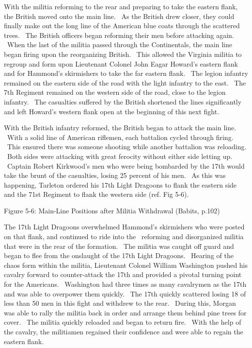 With the militia reforming to the rear and preparing to take the eastern flank,
the British moved onto the main line.  As the British drew closer, they could
finally make out the long line of the American blue coats through the scattered
trees.  The British officers began reforming their men before attacking again.
 When the last of the militia passed through the Continentals, the main line
began firing upon the reorganizing British.  This allowed the Virginia militia
to regroup and form upon Lieutenant Colonel John Eagar Howard’s eastern flank
and for Hammond’s skirmishers to take the far eastern flank.  The legion
infantry remained on the eastern side of the road with the light infantry to the
east.  The 7th Regiment remained on the western side of the road, close to the
legion infantry.  The casualties suffered by the British shortened the lines
significantly and left Howard’s western flank open at the beginning of this next
fight.  

With the British infantry reformed, the British began to attack the main line.
 With a solid line of American riflemen, each battalion cycled through firing.
 This ensured there was someone shooting while another battalion was reloading.
 Both sides were attacking with great ferocity without either side letting up.
 Captain Robert Kirkwood’s men who were being bombarded by the 17th would take
the brunt of the casualties, losing 25 percent of his men.  As this was
happening, Tarleton ordered his 17th Light Dragoons to flank the eastern side
and the 71st Regiment to flank the western side (ref. Fig 5-6).



Figure 5-6: Main-Line Positions after Militia Withdrawal (Babits, p.102)





The 17th Light Dragoons overwhelmed Hammond’s skirmishers who were posted on
that flank, and continued to ride into the  reforming and disorganized militia
that were in the rear of the formation.  The militia was caught off guard and
began to flee from the onslaught of the 17th Light Dragoons.  Hearing of the
chaos form within the militia, Lieutenant Colonel William Washington pushed his
cavalry forward to counter-attack the 17th and provided a pivotal turning point
for the Americans.  Washington had three times as many cavalrymen as the 17th
and was able to overpower them quickly.  The 17th quickly scattered losing 18 of
less than 50 men in this fight and withdrew to the rear.  During this, Morgan
was able to rally the militia back in order and arrange them behind pine trees
for cover.  The militia quickly reloaded and began to return fire.  With the
help of the cavalry, the militiamen regained their confidence and were able to
regain the eastern flank.

